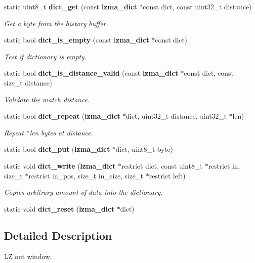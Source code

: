 \begin{DoxyCompactItemize}
\item 
static uint8\-\_\-t {\bf dict\-\_\-get} (const {\bf lzma\-\_\-dict} $\ast$const dict, const uint32\-\_\-t distance)
\begin{DoxyCompactList}\small\item\em Get a byte from the history buffer. \end{DoxyCompactList}\item 
static bool {\bf dict\-\_\-is\-\_\-empty} (const {\bf lzma\-\_\-dict} $\ast$const dict)
\begin{DoxyCompactList}\small\item\em Test if dictionary is empty. \end{DoxyCompactList}\item 
static bool {\bf dict\-\_\-is\-\_\-distance\-\_\-valid} (const {\bf lzma\-\_\-dict} $\ast$const dict, const size\-\_\-t distance)
\begin{DoxyCompactList}\small\item\em Validate the match distance. \end{DoxyCompactList}\item 
static bool {\bf dict\-\_\-repeat} ({\bf lzma\-\_\-dict} $\ast$dict, uint32\-\_\-t distance, uint32\-\_\-t $\ast$len)
\begin{DoxyCompactList}\small\item\em Repeat $\ast$len bytes at distance. \end{DoxyCompactList}\item 
static bool {\bf dict\-\_\-put} ({\bf lzma\-\_\-dict} $\ast$dict, uint8\-\_\-t byte)
\item 
static void {\bf dict\-\_\-write} ({\bf lzma\-\_\-dict} $\ast$restrict dict, const uint8\-\_\-t $\ast$restrict in, size\-\_\-t $\ast$restrict in\-\_\-pos, size\-\_\-t in\-\_\-size, size\-\_\-t $\ast$restrict left)
\begin{DoxyCompactList}\small\item\em Copies arbitrary amount of data into the dictionary. \end{DoxyCompactList}\item 
static void {\bfseries dict\-\_\-reset} ({\bf lzma\-\_\-dict} $\ast$dict)\label{lz__decoder_8h_a729d355916eccfbfd4d97713948dafa5}

\end{DoxyCompactItemize}


\subsection{Detailed Description}
L\-Z out window. 

